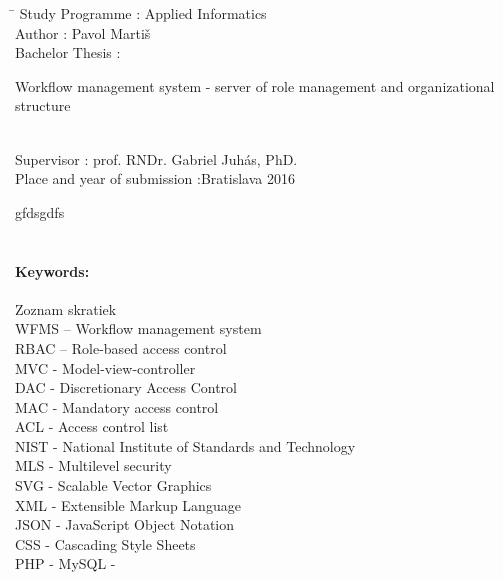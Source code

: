 \documentclass[12pt, oneside]{book}
\def\mfautor{Pavol Martiš}
\begin{document}
\begin{tabbing}	
	\hspace*{7cm}\= \kill
	Study Programme :\> Applied Informatics\\
	Author :\> \mfautor\\
	Bachelor Thesis :\>
	\begin{minipage}[t]{20em}
	Workflow management system - server of role management
	and organizational structure
	\end{minipage} \\
	Supervisor :\> prof. RNDr. Gabriel Juhás, PhD.\\
	
	Place and year of submission :\>Bratislava 2016
\end{tabbing}
gfdsgdfs
\\ \\


\paragraph*{Keywords:} 


%
%



\newpage 


\tableofcontents





\newpage 

{\LARGE Zoznam skratiek}\\

\noindent
WFMS – Workflow management system\\
RBAC – Role-based access control\\
MVC - Model-view-controller\\
DAC - Discretionary Access Control\\
MAC - Mandatory access control\\
ACL - Access control list\\
NIST - National Institute of Standards and Technology\\
MLS - Multilevel security\\
SVG - Scalable Vector Graphics\\
XML - Extensible Markup Language\\
JSON - JavaScript Object Notation\\
CSS - Cascading Style Sheets\\
PHP - 
MySQL - 
\end{document}

